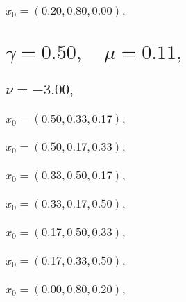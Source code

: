 \documentclass[a4paper]{article}
\begin{document}
\begin{multicols*}{2}
   \subsubsection{\(x_0 = (0.20,0.80,0.00),\quad \)}
   

   \section{\(\gamma = 0.50,\quad \mu = 0.11,\quad \)}
   

   \subsection{\(\nu = -3.00,\quad \)}
   

   \subsubsection{\(x_0 = (0.50,0.33,0.17),\quad \)}
   

   \subsubsection{\(x_0 = (0.50,0.17,0.33),\quad \)}
   

   \subsubsection{\(x_0 = (0.33,0.50,0.17),\quad \)}
   

   \subsubsection{\(x_0 = (0.33,0.17,0.50),\quad \)}
   

   \subsubsection{\(x_0 = (0.17,0.50,0.33),\quad \)}
   

   \subsubsection{\(x_0 = (0.17,0.33,0.50),\quad \)}
   

   \subsubsection{\(x_0 = (0.00,0.80,0.20),\quad \)}
   


\end{multicols*}
\end{document}
